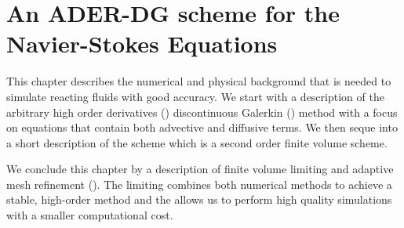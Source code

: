 


\newcommand{\flux}{F}
\newcommand{\viscFlux}{\flux^{v}}
\newcommand{\hyperFlux}{\flux^{h}}
\newcommand{\source}[1][]{
  \notblank{#1}{
S_{#1}
}{
\bm{S}
}
}

\newcommand{\curTime}{t^k}
\newcommand{\nextTime}{t^{k+1}}
\newcommand{\intdt}[1]{\int_{\curTime}^{\nextTime} #1 \dd{t}}
\newcommand{\intdcell}[1]{\int_{\cell} #1 \dd{\bm{x}}}
\newcommand{\intdrefcell}[1]{\int_{\refCell} #1 \dd{\hat{\bm{x}}}}
\newcommand{\intdcellb}[1]{\int_{\cellb} #1 \dd{S}} %
\newcommand{\intdrefcellb}[1]{\int_{\refCellb} #1 \hat{\dd{S}}} %

\newcommand{\quadWeight}[1][i]{w_{#1}}
\newcommand{\quadNode}[1][i]{\hat{x}_{#1}}
\newcommand{\quadNodeNd}[1][i]{\hat{\bm{x}}_{#1}}
\newcommand{\sbasisSize}{(N+1)^\dimensions}
\newcommand{\stbasisSize}{(N+1)^{\dimensions+1}}
\newcommand{\normal}{\bm{n}}

\newcommand{\pleft}{\bm{L}}
\newcommand{\prightsol}{\bm{r}}
\newcommand{\prightpred}{\bm{w}}


\chapter{An ADER-DG scheme for the Navier-Stokes Equations}\label{chap:methods}
This chapter describes the numerical and physical background that is needed to simulate reacting fluids with good accuracy.
We start with a description of the arbitrary high order derivatives (\ader{}) discontinuous Galerkin (\dg{}) method with a focus on equations that contain both advective and diffusive terms.
We then seque into a short description of the \muscl{} scheme which is a second order finite volume scheme.

We conclude this chapter by a description of finite volume limiting and adaptive mesh refinement (\amr{}).
The limiting combines both numerical methods to achieve a stable, high-order method and the \amr{} allows us to perform high quality simulations with a smaller computational cost.

